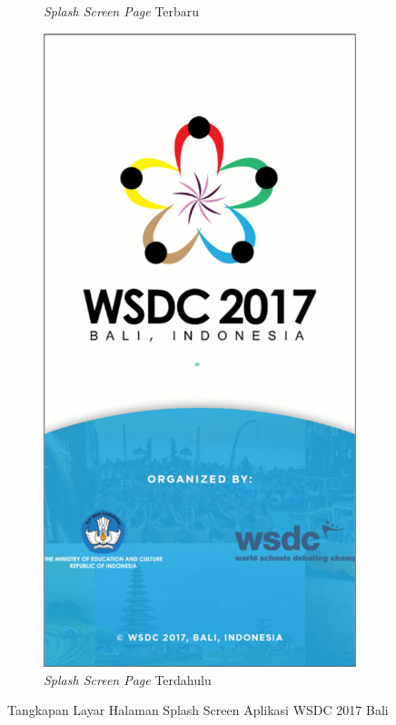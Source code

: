\begin{figure}[H]
\begin{subfigure}[b]{0.3\textwidth}
         \caption{\textit{Splash Screen Page} Terbaru}
         \label{fig:ssSplashScreen}
     \end{subfigure}
     \hspace*{0.5in}
     \begin{subfigure}[b]{0.3\textwidth}
         \centering
         \includegraphics[width=\textwidth]{Gambar/SplashScreenOld.png}
         \caption{\textit{Splash Screen Page} Terdahulu}
         \label{fig:ssSplashScreenOld}
     \end{subfigure}
        \caption{Tangkapan Layar Halaman Splash Screen Aplikasi WSDC 2017 Bali}
        \label{fig:ssApk1}
\end{figure}

